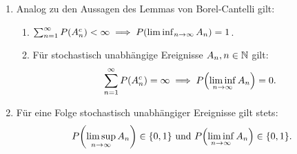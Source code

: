 \documentclass{lecture}
\begin{document}
    \begin{remark}
        \begin{enumerate}[label=(\roman*)]
            \item Analog zu den Aussagen des Lemmas von Borel-Cantelli gilt:
            \begin{enumerate}
                \item \(\sum_{n = 1}^\infty P\parentheses*{A_n^c} < \infty \implies P\parentheses*{\liminf_{n \to \infty}A_n} = 1\).
                \item Für stochastisch unabhängige Ereignisse \(A_n, n \in \mathbb{N}\) gilt:
                \[
                    \sum_{n = 1}^\infty P\parentheses*{A_n^c} = \infty \implies P\parentheses*{\liminf_{n \to \infty}A_n} = 0.
                \]
            \end{enumerate}
            \item Für eine Folge stochastisch unabhängiger Ereignisse gilt stets:
            \[
                P\parentheses*{\limsup_{n \to \infty}A_n} \in \braces*{0, 1}\text{ und }P\parentheses*{\liminf_{n \to \infty}A_n} \in \braces*{0, 1}.
            \]
        \end{enumerate}
    \end{remark}
\end{document}
